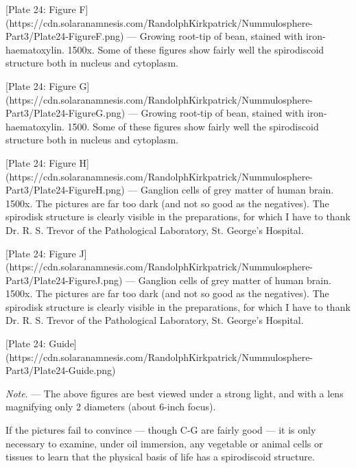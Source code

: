 \documentclass[a4paper, 12pt, oneside]{article}
\begin{document}
[Plate 24: Figure F](https://cdn.solaranamnesis.com/RandolphKirkpatrick/Nummulosphere-Part3/Plate24-FigureF.png) --- Growing root-tip of bean, stained with iron-haematoxylin. 1500x. Some of these figures show fairly well the spirodiscoid structure both in nucleus and cytoplasm.

[Plate 24: Figure G](https://cdn.solaranamnesis.com/RandolphKirkpatrick/Nummulosphere-Part3/Plate24-FigureG.png) --- Growing root-tip of bean, stained with iron-haematoxylin. 1500. Some of these figures show fairly well the spirodiscoid structure both in nucleus and cytoplasm.

[Plate 24: Figure H](https://cdn.solaranamnesis.com/RandolphKirkpatrick/Nummulosphere-Part3/Plate24-FigureH.png) --- Ganglion cells of grey matter of human brain. 1500x. The pictures are far too dark (and not so good as the negatives). The spirodisk structure is clearly visible in the preparations, for which I have to thank Dr. R. S. Trevor of the Pathological Laboratory, St. George's Hospital.

[Plate 24: Figure J](https://cdn.solaranamnesis.com/RandolphKirkpatrick/Nummulosphere-Part3/Plate24-FigureJ.png) --- Ganglion cells of grey matter of human brain. 1500x. The pictures are far too dark (and not so good as the negatives). The spirodisk structure is clearly visible in the preparations, for which I have to thank Dr. R. S. Trevor of the Pathological Laboratory, St. George's Hospital.

[Plate 24: Guide](https://cdn.solaranamnesis.com/RandolphKirkpatrick/Nummulosphere-Part3/Plate24-Guide.png)

\emph{Note}. --- The above figures are best viewed under a strong light, and with a lens magnifying only 2 diameters (about 6-inch focus).

If the pictures fail to convince --- though C-G are fairly good --- it is only necessary to examine, under oil immersion, any vegetable or animal cells or tissues to learn that the physical basis of life has a spirodiscoid structure.
\clearpage
\end{document}
